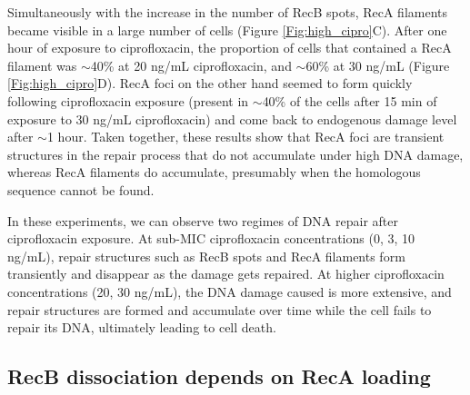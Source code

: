 Simultaneously with the increase in the number of RecB spots, RecA filaments became visible in a large number of cells (Figure \ref{Fig:high_cipro}C). After one hour of exposure to ciprofloxacin, the proportion of cells that contained a RecA filament was $\sim$40\% at 20 ng/mL ciprofloxacin, and $\sim$60\% at 30 ng/mL (Figure \ref{Fig:high_cipro}D). RecA foci on the other hand seemed to form quickly following ciprofloxacin exposure (present in $\sim$40\% of the cells after 15 min of exposure to 30 ng/mL ciprofloxacin) and come back to endogenous damage level after $\sim$1 hour. Taken together, these results show that RecA foci are transient structures in the repair process that do not accumulate under high DNA damage, whereas RecA filaments do accumulate, presumably when the homologous sequence cannot be found.

In these experiments, we can observe two regimes of DNA repair after ciprofloxacin exposure. At sub-MIC ciprofloxacin concentrations (0, 3, 10 ng/mL), repair structures such as RecB spots and RecA filaments form transiently and disappear as the damage gets repaired. At higher ciprofloxacin concentrations (20, 30 ng/mL), the DNA damage caused is more extensive, and repair structures are formed and accumulate over time while the cell fails to repair its DNA, ultimately leading to cell death.


\subsection*{RecB dissociation depends on RecA loading}

